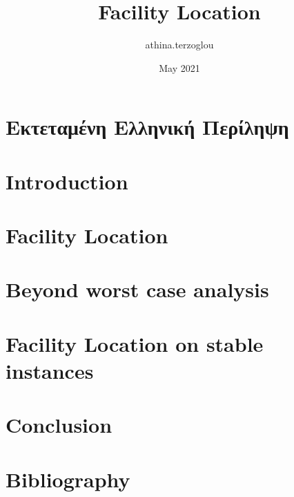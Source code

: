 \documentclass[12pt]{report}
\title{Facility Location}
\author{athina.terzoglou}
\date{May 2021}
\begin{document}
\maketitle

\tableofcontents


\chapter{Εκτεταμένη Ελληνική Περίληψη}




\chapter{Introduction}

\chapter{Facility Location}

%
%
\chapter{Beyond worst case analysis}

\chapter{Facility Location on stable instances}

\chapter{Conclusion}


\chapter{Bibliography}


\end{document}
